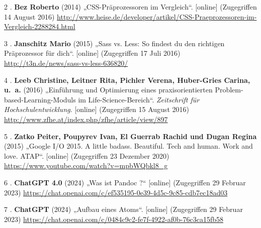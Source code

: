 \documentclass[
    headings=optiontotocandhead,%
    twoside,
    numbers=noenddot,%
    12pt, %
    titlepage, %
    parskip=full, %
    listof=leveldown, 
    numbers=noenddot, %
    a4paper,DIV=14,
    BCOR=15mm,
]{scrbook}
\newcommand*{\authormark}{}
\begin{document}
\leavevmode\hypertarget{ref-heise}{}%
2 . \textbf{Bez Roberto} (2014) „CSS-Präprozessoren im Vergleich``.
{[}online{]} (Zugegriffen 14 August 2016)
\url{http://www.heise.de/developer/artikel/CSS-Praeprozessoren-im-Vergleich-2288284.html}

\leavevmode\hypertarget{ref-t3n}{}%
3 . \textbf{Janschitz Mario} (2015) „Sass vs. Less: So findest du den
richtigen Präprozessor für dich``. {[}online{]} (Zugegriffen 17 Juli
2016) \url{http://t3n.de/news/sass-vs-less-636820/}

\leavevmode\hypertarget{ref-leeb_einfuhrung_2016}{}%
4 . \textbf{Leeb Christine, Leitner Rita, Pichler Verena, Huber-Gries
Carina, u.~a.} (2016) „Einführung und Optimierung eines
praxisorientierten Problem-based-Learning-Moduls im
Life-Science-Bereich``. \emph{Zeitschrift für Hochschulentwicklung}.
{[}online{]} (Zugegriffen 15 August 2016)
\url{http://www.zfhe.at/index.php/zfhe/article/view/897}

\leavevmode\hypertarget{ref-Zatko15}{}%
5 . \textbf{Zatko Peiter, Poupyrev Ivan, El Guerrab Rachid und Dugan
Regina} (2015) „Google I/O 2015. A little badass. Beautiful. Tech and
human. Work and love. ATAP``. {[}online{]} (Zugegriffen 23 Dezember
2020) \url{https://www.youtube.com/watch?v=mpbWQbkl8_g}

\leavevmode\hypertarget{ref-gpt-pandoc}{}%
6 . \textbf{ChatGPT 4.0} (2024) „Was ist Pandoc ?`` {[}online{]}
(Zugegriffen 29 Februar 2023)
\url{https://chat.openai.com/c/ef535195-0e39-4d5c-9c85-cdb7ec18ad03}

\leavevmode\hypertarget{ref-gpt-atomaufbau}{}%
7 . \textbf{ChatGPT} (2024) „Aufbau eines Atoms``. {[}online{]}
(Zugegriffen 29 Februar 2023)
\url{https://chat.openai.com/c/0484c9c2-fe7f-4922-af0b-76c3ca15fb58}

\renewcommand{\authormark}{}%
\cleardoublepage{}



\end{document}
